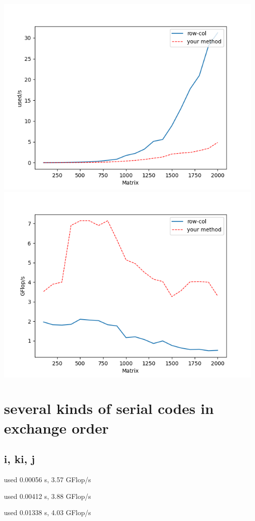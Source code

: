 \documentclass[12pt]{article}
\begin{document}
\includegraphics[scale=0.5]{1s}
\includegraphics[scale=0.5]{1g}

\section{several kinds of serial codes in exchange order}

\subsection{i, ki, j}

used 0.00056 s, 3.57 GFlop/s

used 0.00412 s, 3.88 GFlop/s

used 0.01338 s, 4.03 GFlop/s
\end{document}
